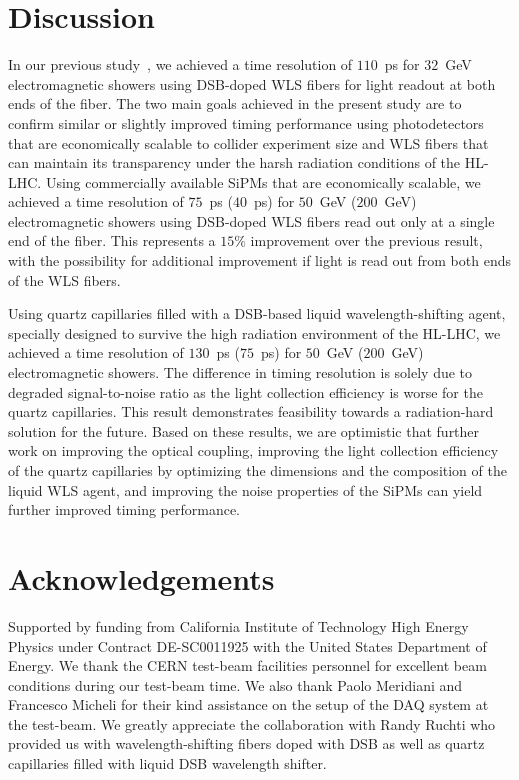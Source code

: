 \documentclass[preprint,1p]{elsarticle}
\begin{document}
  
%
%
  
%
%

\section{Discussion} 
In our previous study~\cite{Anderson:2015gha}, we achieved
a time resolution of $110$~ps for $32$~GeV electromagnetic showers using
DSB-doped WLS fibers for light readout at both ends of the fiber. The two main
goals achieved in the present study are to confirm similar or slightly improved
timing performance using photodetectors that are economically scalable to
collider experiment size and WLS fibers that can maintain its transparency under
the harsh radiation conditions of the HL-LHC. Using commercially available SiPMs
that are economically scalable, we achieved a time resolution of $75$~ps
($40$~ps) for $50$~GeV ($200$~GeV) electromagnetic showers using DSB-doped WLS
fibers read out only at a single end of the fiber. This represents a $15\%$
improvement over the previous result, with the possibility for additional
improvement if light is read out from both ends of the WLS fibers. 

Using quartz capillaries filled with a DSB-based liquid wavelength-shifting
agent, specially designed to survive the high radiation environment of the
HL-LHC, we achieved a time resolution of $130$~ps ($75$~ps) for $50$~GeV
($200$~GeV) electromagnetic showers. The difference in timing resolution is
solely due to degraded signal-to-noise ratio as the light collection efficiency
is worse for the quartz capillaries. This result demonstrates feasibility
towards a radiation-hard solution for the future. Based on these results, we are
optimistic that further work on improving the optical coupling, improving the
light collection efficiency of the quartz capillaries by optimizing the
dimensions and the composition of the liquid WLS agent, and improving the noise
properties of the SiPMs can yield further improved timing performance. 

  
%
%

\section{Acknowledgements} 
Supported by funding from California Institute of
Technology High Energy Physics under Contract DE-SC0011925 with the United
States Department of Energy. We thank the CERN test-beam facilities personnel for
excellent beam conditions during our test-beam time. We also thank Paolo
Meridiani and Francesco Micheli for their kind assistance on the setup of the
DAQ system at the test-beam. We greatly appreciate the collaboration with Randy
Ruchti who provided us with wavelength-shifting fibers doped with DSB as well as
quartz capillaries filled with liquid DSB wavelength shifter.
%
%


{}
 
\end{document}
